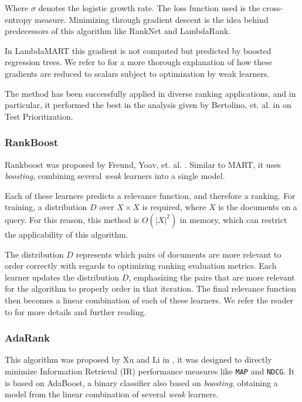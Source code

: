 Where $\sigma$ denotes the logistic growth rate. The loss function used is the cross-entropy measure. 
Minimizing through gradient descent is the idea behind predecessors
of this algorithm like RankNet and LambdaRank.

In LambdaMART this gradient is not computed but predicted by boosted regression trees. We refer
to \cite{lambdamart} for a more thorough explanation of how these gradients are reduced to scalars
subject to optimization by weak learners.

The method has been successfully applied in diverse ranking applications, and in particular, it performed
the best in the analysis given by Bertolino, et. al. in \cite{Bertolino2020LearningtoRankVR} on Test Prioritization.

\subsubsection{RankBoost}\label{s:bg-tsp-rankboost}

Rankboost was proposed by Freund, Yoav, et. al. \cite{10.5555/945365.964285}. Similar to MART, it uses \emph{boosting}, combining
several \emph{weak} learners into a single model.

Each of these learners predicts a relevance function, and therefore a ranking. For training, a distribution $D$ over
$X\times X$ is required, where $X$ is the documents on a query. For this reason, this method is $O(|X|^2)$ in memory, which
can restrict the applicability of this algorithm. 

The distribution $D$ represents which pairs of documents are more relevant to order correctly with regards to
optimizing ranking evaluation metrics. Each learner updates the distribution $D$, emphasizing the pairs that are more relevant for the algorithm
to properly order in that iteration. The final relevance function then becomes a linear combination of each of these learners.
We refer the reader to \cite{10.5555/945365.964285} for more details and further reading.

\subsubsection{AdaRank}
This algorithm was proposed by Xu and Li in \cite{xuliadarank}, it was designed to directly minimize Information Retrieval (IR) performance measures
like \texttt{MAP} and \texttt{NDCG}. It is based on AdaBoost, a binary classifier also based on \emph{boosting},
obtaining a model from the linear combination of several \emph{weak} learners.

